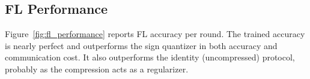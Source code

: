 \subsection{FL Performance}
Figure~\ref{fig:fl_performance} reports FL accuracy per round. The trained accuracy is nearly perfect and outperforms the sign quantizer in both accuracy and communication cost. It also outperforms the identity (uncompressed) protocol, probably as the compression acts as a regularizer.
